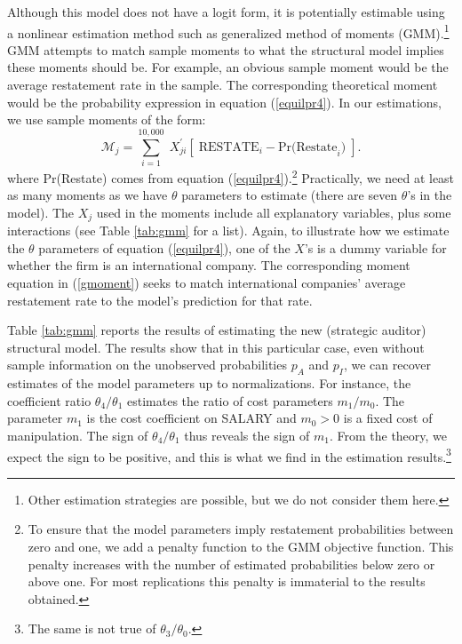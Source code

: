 Although this model does not have a logit form, it is potentially estimable using a nonlinear estimation method such as generalized method of moments (GMM).\footnote{
Other estimation strategies are possible, but we do not consider them here.}
GMM attempts to match sample moments to what the structural model implies 
these moments should be. 
For example, an obvious sample moment would be the average restatement rate in the sample.
The corresponding theoretical moment would be the probability expression in equation (\ref{equilpr4}).
In our estimations, we use sample moments of the form:
\begin{equation}\label{gmoment}
\mathcal{M}_j = \sum_{i=1}^{10,000} \; X_{ji}^\prime \left[ \; \mbox{RESTATE}_{i} - \mbox{Pr(Restate}_i\mbox{)} \; \right]. 
\end{equation}
where Pr(Restate) comes from equation (\ref{equilpr4}).\footnote{
To ensure that the model parameters imply restatement probabilities between zero and one, we add a penalty function to the GMM objective function.
This penalty increases with the number of estimated probabilities below zero or above one.
For most replications this penalty is immaterial to the results obtained.}
Practically, we need at least as many moments as we have $\theta$ parameters to estimate (there are seven $\theta$'s in the model).
The $X_j$ used in the moments include all explanatory variables,
plus some interactions (see Table \ref{tab:gmm} for a list).
Again, to illustrate how we estimate the $\theta$ parameters of equation (\ref{equilpr4}), one of the $X$'s is a dummy variable for whether the firm is an international company. The corresponding moment equation in (\ref{gmoment}) seeks to match international companies' average restatement rate to the model's prediction for that rate.

Table \ref{tab:gmm} reports the results of estimating the new (strategic auditor) structural model. 
The results show that in this particular case, even without sample information on the unobserved probabilities $p_A$ and $p_I$, we can recover estimates of the model parameters up to normalizations.
For instance, the coefficient ratio $\theta_4/\theta_1$ estimates the ratio of cost parameters $m_1/m_0$.
The parameter $m_1$ is the cost coefficient on SALARY and 
$m_0 > 0$ is a fixed cost of manipulation. The sign of $\theta_4/\theta_1$ thus reveals the sign of $m_1$.
From the theory, we expect the sign to be positive, and this is what we find in the estimation results.\footnote{The same is not true of $\theta_3/\theta_0$.}

